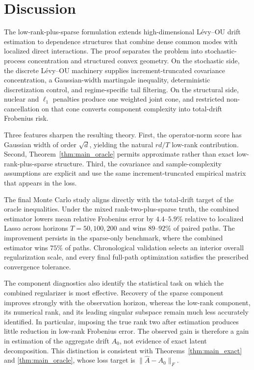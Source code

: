 \documentclass[12pt]{article}
\theoremstyle{definition}
\begin{document}
	\section{Discussion}
	
	The low-rank-plus-sparse formulation extends high-dimensional L\'evy--OU drift estimation to dependence structures that combine dense common modes with localized direct interactions. The proof separates the problem into stochastic-process concentration and structured convex geometry. On the stochastic side, the discrete L\'evy--OU machinery supplies increment-truncated covariance concentration, a Gaussian-width martingale inequality, deterministic discretization control, and regime-specific tail filtering. On the structural side, nuclear and $\ell_1$ penalties produce one weighted joint cone, and restricted non-cancellation on that cone converts component complexity into total-drift Frobenius risk.
	
	Three features sharpen the resulting theory. First, the operator-norm score has Gaussian width of order $\sqrt d$, yielding the natural $rd/T$ low-rank contribution. Second, Theorem~\ref{thm:main_oracle} permits approximate rather than exact low-rank-plus-sparse structure. Third, the covariance and sample-complexity assumptions are explicit and use the same increment-truncated empirical matrix that appears in the loss.
	
	The final Monte Carlo study aligns directly with the total-drift target of the oracle inequalities. Under the mixed rank-two-plus-sparse truth, the combined estimator lowers mean relative Frobenius error by $4.4$--$5.9\%$ relative to localized Lasso across horizons $T=50,100,200$ and wins $89$--$92\%$ of paired paths. The improvement persists in the sparse-only benchmark, where the combined estimator wins $75\%$ of paths. Chronological validation selects an interior overall regularization scale, and every final full-path optimization satisfies the prescribed convergence tolerance.
	
	The component diagnostics also identify the statistical task on which the combined regularizer is most effective. Recovery of the sparse component improves strongly with the observation horizon, whereas the low-rank component, its numerical rank, and its leading singular subspace remain much less accurately identified. In particular, imposing the true rank two after estimation produces little reduction in low-rank Frobenius error. The observed gain is therefore a gain in estimation of the aggregate drift $A_0$, not evidence of exact latent decomposition. This distinction is consistent with Theorems~\ref{thm:main_exact} and \ref{thm:main_oracle}, whose loss target is $\|\widehat A-A_0\|_F$.
	
\end{document}
